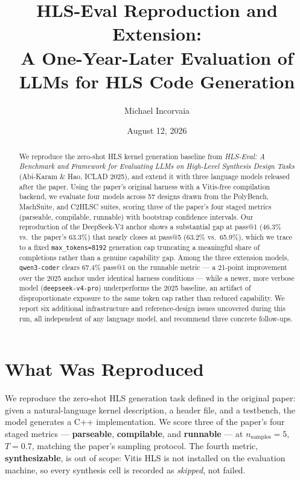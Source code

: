\documentclass[11pt]{article}
\title{\textbf{HLS-Eval Reproduction and Extension:\\
A One-Year-Later Evaluation of LLMs for HLS Code Generation}}
\author{Michael Incorvaia}
\date{August 12, 2026}
\newcommand{\code}[1]{\texttt{#1}}
\begin{document}
\maketitle

\begin{abstract}
We reproduce the zero-shot HLS kernel generation baseline from
\emph{HLS-Eval: A Benchmark and Framework for Evaluating LLMs on
High-Level Synthesis Design Tasks} (Abi-Karam \& Hao, ICLAD 2025), and
extend it with three language models released after the paper. Using
the paper's original harness with a Vitis-free compilation backend, we
evaluate four models across 57 designs drawn from the PolyBench,
MachSuite, and C2HLSC suites, scoring three of the paper's four staged
metrics (parseable, compilable, runnable) with bootstrap confidence
intervals. Our reproduction of the DeepSeek-V3 anchor shows a
substantial gap at pass@1 (46.3\% vs.\ the paper's 63.3\%) that nearly
closes at pass@5 (63.2\% vs.\ 65.9\%), which we trace to a fixed
\code{max\_tokens=8192} generation cap truncating a meaningful share of
completions rather than a genuine capability gap. Among the three
extension models, \code{qwen3-coder} clears 67.4\% pass@1 on the
runnable metric --- a 21-point improvement over the 2025 anchor under
identical harness conditions --- while a newer, more verbose model
(\code{deepseek-v4-pro}) underperforms the 2025 baseline, an artifact of
disproportionate exposure to the same token cap rather than reduced
capability. We report six additional infrastructure and reference-design
issues uncovered during this run, all independent of any language
model, and recommend three concrete follow-ups.
\end{abstract}

\tableofcontents

\section{What Was Reproduced}

We reproduce the zero-shot HLS generation task defined in the original
paper: given a natural-language kernel description, a header file, and a
testbench, the model generates a C++ implementation. We score three of
the paper's four staged metrics --- \textbf{parseable}, \textbf{compilable},
and \textbf{runnable} --- at $n_{\text{samples}}=5$, $T=0.7$, matching the
paper's sampling protocol. The fourth metric, \textbf{synthesizable}, is
out of scope: Vitis HLS is not installed on the evaluation machine, so
every synthesis cell is recorded as \emph{skipped}, not failed.
\end{document}
